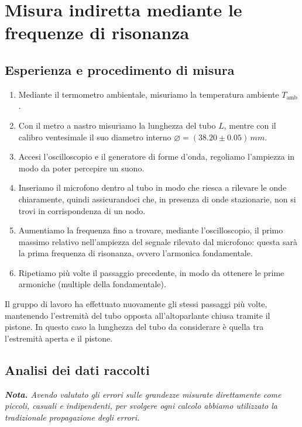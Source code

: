 \documentclass{article}
\newcommand*{\diam}{\varnothing}
\begin{document}
\pagebreak
\section{Misura indiretta mediante le frequenze di risonanza}

\subsection{Esperienza e procedimento di misura}

\begin{enumerate}
  \item
    Mediante il termometro ambientale,
    misuriamo la temperatura ambiente $T_\text{amb}$.
  \item
    Con il metro a nastro misuriamo la lunghezza del tubo $L$,
    mentre con il calibro ventesimale il suo diametro interno
    $\diam=(38.20\pm0.05)\,\unit{mm}$.
  \item
    Accesi l'oscilloscopio e il generatore di forme d'onda,
    regoliamo l'ampiezza in modo da poter percepire un suono.
  \item
    Inseriamo il microfono dentro al tubo in modo che riesca a rilevare le onde
    chiaramente, quindi assicurandoci che, in presenza di onde stazionarie,
    non si trovi in corrispondenza di un nodo.
  \item
    Aumentiamo la frequenza fino a trovare, mediante l'oscilloscopio,
    il primo massimo relativo nell'ampiezza del segnale rilevato dal
    microfono: questa sarà la prima frequenza di risonanza,
    ovvero l'armonica fondamentale.
  \item
    Ripetiamo più volte il passaggio precedente, in modo da ottenere le prime
    armoniche (multiple della fondamentale).
\end{enumerate}
Il gruppo di lavoro ha effettuato nuovamente gli stessi passaggi più volte,
mantenendo l'estremità del tubo opposta all'altoparlante chiusa tramite il pistone.
In questo caso la lunghezza del tubo da considerare è quella tra l'estremità
aperta e il pistone.

\subsection{Analisi dei dati raccolti}
\emph{\textbf{Nota.}
Avendo valutato gli errori sulle grandezze misurate direttamente
come piccoli, casuali e indipendenti, per svolgere ogni calcolo
abbiamo utilizzato la tradizionale propagazione degli errori.
}
\vspace{2mm}
\end{document}
